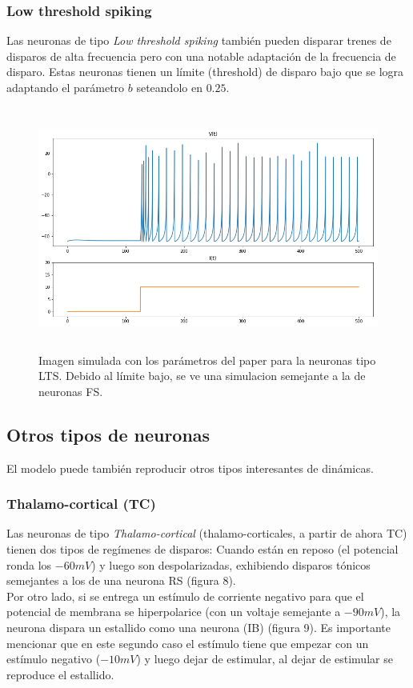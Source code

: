 \documentclass[12pt]{article}
\begin{document}
\subsubsection{Low threshold spiking}
Las neuronas de tipo \textit{Low threshold spiking} también pueden disparar trenes de disparos de alta frecuencia pero con una notable adaptación de la frecuencia de disparo. Estas neuronas tienen un límite (threshold)
de disparo bajo que se logra adaptando el parámetro $b$ seteandolo en $0.25$.

\begin{figure}[h!]
    \centering
        \includegraphics[height=8cm]{images/LTS.png}
    \caption[fontsize=2pt]{Imagen simulada con los parámetros del paper para la neuronas tipo LTS. Debido al límite bajo, se ve una simulacion semejante a la de neuronas FS.}
\end{figure}
\newpage

\subsection{Otros tipos de neuronas}
El modelo puede también reproducir otros tipos interesantes de dinámicas.

\subsubsection{Thalamo-cortical (TC)}
Las neuronas de tipo \textit{Thalamo-cortical} (thalamo-corticales, a partir de ahora TC) tienen dos tipos de regímenes de disparos:
Cuando están en reposo (el potencial ronda los $-60 mV$) y luego son despolarizadas, exhibiendo disparos tónicos semejantes a los de una neurona RS (figura 8). \\
Por otro lado, si se entrega un estímulo de corriente negativo para que el potencial de membrana se hiperpolarice (con un voltaje semejante a $-90 mV$), la neurona dispara un estallido como una neurona (IB) (figura 9).
Es importante mencionar que en este segundo caso el estímulo tiene que empezar con un estímulo negativo ($-10mV$) y luego dejar de estimular, al dejar de estimular se reproduce el estallido.
\end{document}
